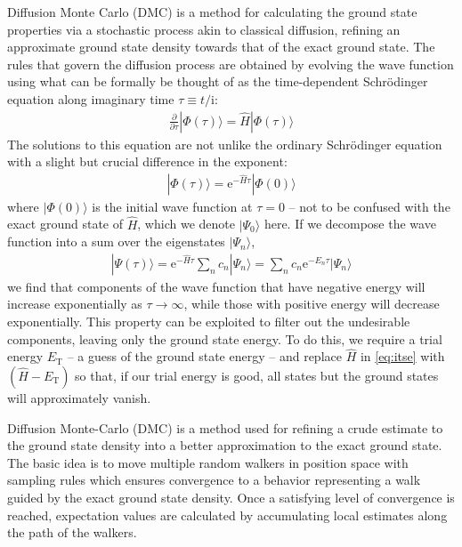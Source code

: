 Diffusion Monte Carlo (DMC) is a method for calculating the ground state properties via a stochastic process akin to classical diffusion, refining an approximate ground state density towards that of the exact ground state.  The rules that govern the diffusion process are obtained by evolving the wave function using what can be formally be thought of as the time-dependent Schr\"odinger equation along imaginary time $\tau \equiv t / \mathrm{i}$:
\begin{align} \label{eq:itse}
  \frac{\partial}{\partial \tau} |\Phi(\tau)\rangle = \hat H |\Phi(\tau)\rangle
\end{align}
The solutions to this equation are not unlike the ordinary Schr\"odinger equation with a slight but crucial difference in the exponent:
\begin{align*}
  |\Phi(\tau)\rangle = \mathrm e^{-\hat H \tau} |\Phi(0)\rangle
\end{align*}
where $|\Phi(0)\rangle$ is the initial wave function at $\tau = 0$ -- not to be confused with the exact ground state of $\hat H$, which we denote $|\Psi_0\rangle$ here.  If we decompose the wave function into a sum over the eigenstates $|\Psi_n\rangle$,
\begin{align*}
  |\Psi(\tau)\rangle
  = \mathrm e^{-\hat H \tau} \sum_n c_n |\Psi_n\rangle
  = \sum_n c_n \mathrm e^{-E_n \tau} |\Psi_n\rangle
\end{align*}
we find that components of the wave function that have negative energy will increase exponentially as $\tau \to \infty$, while those with positive energy will decrease exponentially.  This property can be exploited to filter out the undesirable components, leaving only the ground state energy.  To do this, we require a trial energy $E_{\text{T}}$ -- a guess of the ground state energy -- and replace $\hat H$ in \eqref{eq:itse} with $(\hat H - E_{\text{T}})$ so that, if our trial energy is good, all states but the ground states will approximately vanish.

Diffusion Monte-Carlo (DMC) is a method used for refining a crude estimate to the ground state density into a better approximation to the exact ground state. The basic idea is to move multiple random walkers in position space with sampling rules which ensures convergence to a behavior representing a walk guided by the exact ground state density. Once a satisfying level of convergence is reached, expectation values are calculated by accumulating local estimates along the path of the walkers.

